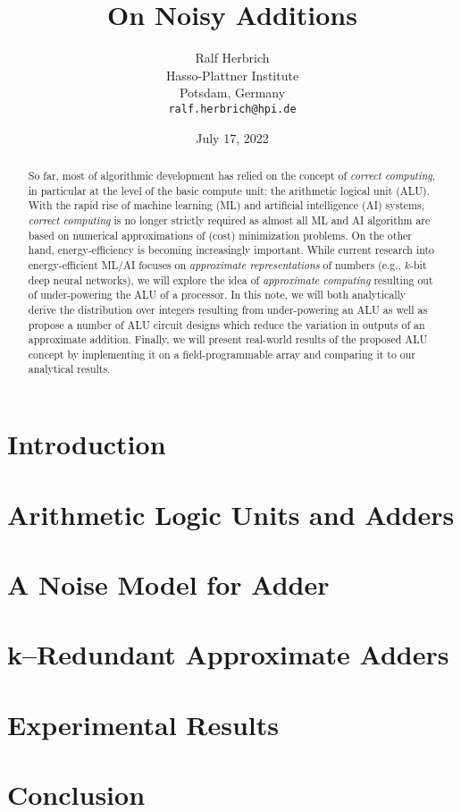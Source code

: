 \documentclass{article}
\title{On Noisy Additions}
\date{July 17, 2022}		%
\author{Ralf Herbrich \\
	Hasso-Plattner Institute\\
	Potsdam, Germany \\
	\texttt{ralf.herbrich@hpi.de} \\
}
\newcommand{\0}{\boldsymbol{0}}
\newcommand{\1}{\boldsymbol{1}}
\begin{document}
\maketitle

\begin{abstract}
	So far, most of algorithmic development has relied on the concept of {\em correct computing}, in particular at the level of the basic compute unit: the arithmetic logical unit (ALU). With the rapid rise of machine learning (ML) and artificial intelligence (AI) systems, {\em correct computing} is no longer strictly required as almost all ML and AI algorithm are based on numerical approximations of (cost) minimization problems. On the other hand, energy-efficiency is becoming increasingly important. While current research into energy-efficient ML/AI focuses on {\em approximate representations} of numbers (e.g., $k$-bit deep neural networks), we will explore the idea of {\em approximate computing} resulting out of under-powering the ALU of a processor. In this note, we will both analytically derive the distribution over integers resulting from under-powering an ALU as well as propose a number of ALU circuit designs which reduce the variation in outputs of an approximate addition. Finally, we will present real-world results of the proposed ALU concept by implementing it on a field-programmable array and comparing it to our analytical results.
\end{abstract}




\section{Introduction}


\section{Arithmetic Logic Units and Adders}


\section{A Noise Model for Adder}


\section{k--Redundant Approximate Adders}


\section{Experimental Results}

\section{Conclusion}


 
\end{document}
